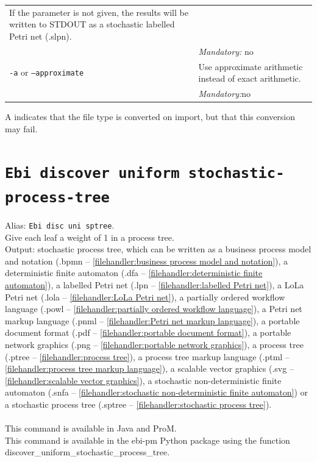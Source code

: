{\begin{tabularx}{\linewidth}{lX}
If the parameter is not given, the results will be written to STDOUT as a stochastic labelled Petri net (.slpn).\\
&\textit{Mandatory:} \quad no\\
\texttt{-a} or \texttt{--approximate} & Use approximate arithmetic instead of exact arithmetic.\\
&\textit{Mandatory:}\quad no\\
\bottomrule
\end{tabularx}
A \textdagger{} indicates that the file type is converted on import, but that this conversion may fail.
\clearpage\section{\texttt{Ebi discover uniform stochastic-process-tree}}
\label{command:Ebi discover uniform stochastic-process-tree}
Alias: \texttt{Ebi disc uni sptree}.\\
Give each leaf a weight of 1 in a process tree.\\
\noindent Output: stochastic process tree, which can be written as a business process model and notation (.bpmn -- \cref{filehandler:business process model and notation}), a deterministic finite automaton (.dfa -- \cref{filehandler:deterministic finite automaton}), a labelled Petri net (.lpn -- \cref{filehandler:labelled Petri net}), a LoLa Petri net (.lola -- \cref{filehandler:LoLa Petri net}), a partially ordered workflow language (.powl -- \cref{filehandler:partially ordered workflow language}), a Petri net markup language (.pnml -- \cref{filehandler:Petri net markup language}), a portable document format (.pdf -- \cref{filehandler:portable document format}), a portable network graphics (.png -- \cref{filehandler:portable network graphics}), a process tree (.ptree -- \cref{filehandler:process tree}), a process tree markup language (.ptml -- \cref{filehandler:process tree markup language}), a scalable vector graphics (.svg -- \cref{filehandler:scalable vector graphics}), a stochastic non-deterministic finite automaton (.snfa -- \cref{filehandler:stochastic non-deterministic finite automaton}) or a stochastic process tree (.sptree -- \cref{filehandler:stochastic process tree}).\\
\\This command is available in Java and ProM.
\\This command is available in the ebi-pm Python package using the function discover\_uniform\_stochastic\_process\_tree.
\begin{tabularx}{\linewidth}{lX}

\end{tabularx}}
